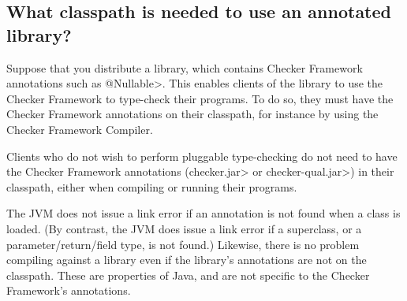 \subsection{What classpath is needed to use an annotated library?\label{faq-classpath-to-use-annotated-library}}

Suppose that you distribute a library, which contains Checker Framework
annotations such as \<@Nullable>.  This enables clients of the library to
use the Checker Framework to type-check their programs.  To do so, they
must have the Checker Framework annotations on their classpath, for
instance by using the Checker Framework Compiler.

Clients who do not wish to perform pluggable type-checking do not need to
have the Checker Framework annotations (\<checker.jar> or
\<checker-qual.jar>) in their classpath, either when compiling or running
their programs.

The JVM does not issue a link error if an annotation is not found when a
class is loaded.  (By contrast, the JVM does issue a link error if a
superclass, or a parameter/return/field type, is not found.)
Likewise, there is no problem compiling against a library even if the
library's annotations are not on the classpath.
These are properties of Java, and are not specific to the Checker
Framework's annotations.



